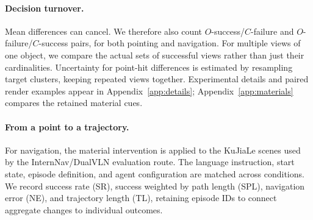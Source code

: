 \paragraph{Decision turnover.}
Mean differences can cancel. We therefore also count $O$-success/$C$-failure and
$O$-failure/$C$-success pairs, for both pointing and navigation. For multiple
views of one object, we compare the actual sets of successful views rather than
just their cardinalities. Uncertainty for point-hit differences is estimated by
resampling target clusters, keeping repeated views together. Experimental
details and paired render examples appear in Appendix~\ref{app:details};
Appendix~\ref{app:materials} compares the retained material cues.

\paragraph{From a point to a trajectory.}
For navigation, the material intervention is applied to the KuJiaLe scenes used
by the InternNav/DualVLN evaluation route. The language instruction, start state,
episode definition, and agent configuration are matched across conditions. We
record success rate (SR), success weighted by path length (SPL), navigation error
(NE), and trajectory length (TL), retaining episode IDs to connect aggregate
changes to individual outcomes.
